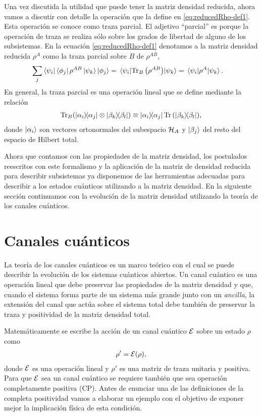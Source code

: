 Una vez discutida la utilidad que puede tener la matriz densidad
reducida, ahora vamos a discutir con detalle la operación que 
la define en \eqref{eq:reducedRho-def1}. 
Esta operación se conoce como traza parcial. El adjetivo ``parcial''
es porque la operación de traza se realiza sólo sobre los grados 
de libertad de alguno de los subsistemas. En la ecuación 
\eqref{eq:reducedRho-def1} denotamos a la matriz densidad 
reducida $\rho^A$ como la traza parcial sobre $B$ de $\rho^{AB}$,
\begin{align} 
	\sum _j \bra{\psi_i}\bra{\phi_j}\rho^{AB}\ket{\psi_k}\ket{\phi_j}
	&=\matrixel{\psi_i}{\Tr_B\qty(\rho^{AB})}{\psi_k}
	= \matrixel{\psi_i}{\rho^A}{\psi_k}.
	\label{eq:partialTrace-def}
\end{align}
En general, la traza parcial es una operación lineal
que se define mediante la relación~\cite{nielsen_chuang_2011}
\begin{align}
	\Tr_B (\dyad{\alpha_i}{\alpha_j}\otimes \dyad{\beta_k}{\beta_l})
	\equiv
	\dyad{\alpha_i}{\alpha_j}\Tr \qty(\dyad{\beta_k}{\beta_l}),
	\label{eq:part_trace-def}
\end{align}
donde $\ket{\alpha_i}$ son vectores ortonormales del subespacio $\mathcal{H}_A$
y $\ket{\beta_j}$ del resto del espacio de Hilbert total.

Ahora que contamos con las propiedades de la matriz densidad, 
los postulados reescritos con este formalismo y la aplicación de la matriz
de densidad reducida para describir subsistemas ya disponemos de
las herramientas adecuadas para describir a los estados cuánticos 
utilizando a la matriz densidad. En la siguiente sección continuamos 
con la evolución de la matriz densidad utilizando la teoría de los 
canales cuánticos.

\section{Canales cuánticos}\label{sec:qtm-channels} %

La teoría de los canales cuánticos es un marco teórico con el cual 
se puede describir la evolución de los sistemas cuánticos abiertos.
Un canal cuántico es una operación lineal que debe preservar las 
propiedades de la matriz densidad y que, cuando el sistema forma
parte de un sistema más grande junto con un \textit{ancilla}, la
extensión del canal que actúa sobre el sistema total debe también 
de preservar la traza y positividad de la matriz densidad total.

Matemáticamente se escribe la acción de un canal cuántico $\mathcal{E}$ 
sobre un estado $\rho$ como
\begin{align} \label{eq:E(rho)}
\rho' = \mathcal{E} (\rho),
\end{align} 
donde $\mathcal{E}$ es una operación lineal y $\rho'$ es una matriz de
traza unitaria y positiva. Para que $\mathcal{E}$ sea un canal cuántico 
se requiere también que sea operación completamente positiva (CP). 
Antes de enunciar una de las definiciones de la completa positividad
vamos a elaborar un ejemplo con el objetivo de exponer mejor la 
implicación física de esta condición.


